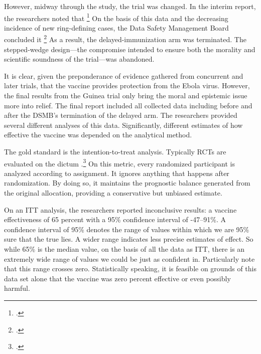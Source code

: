 \documentclass[letterpaper,notitlepage,12pt]{article}
\begin{document}
However, midway through the study, the trial was changed.
In the interim report, 
the researchers noted that \footcite[p. 857]{HR 2015}
On the basis of this data and the decreasing incidence of new ring-defining
cases, the Data Safety Management Board concluded it
\footcite{UF 2015} 
As a result, the delayed-immunization arm was terminated.
The stepped-wedge design---the compromise intended to ensure both the morality
and scientific soundness of the trial---was abandoned.

It is clear, given the preponderance of evidence gathered from
concurrent and later trials, that the vaccine provides protection
from the Ebola virus.
However, the final results from the Guinea trial only bring the moral and
epistemic issue more into relief.
The final report included all collected data including before and after the 
DSMB's termination of the delayed arm.
The researchers provided several different analyses of this data.
Significantly, different estimates of how effective the vaccine was depended on
the analytical method.

The gold standard is the intention-to-treat analysis.
Typically RCTs are evaluated on the dictum .\footcite{Heenekens et al 1987}
On this metric, every randomized participant is analyzed according to
assignment.
It ignores anything that happens after randomization.
By doing so, it maintains the prognostic balance generated from the original
allocation, providing a conservative but unbiased estimate.

On an ITT analysis, the researchers reported inconclusive results: a vaccine
effectiveness of 65 percent with a 95\% confidence interval of -47--91\%.
A confidence interval of 95\% denotes the range of values within which we are
95\% sure that the true lies.
A wider range indicates less precise estimates of effect.
So while 65\% is the median value, on the basis of all the data as ITT, there 
is an extremely wide range of values we could be just as confident in.
Particularly note that this range crosses zero.
Statistically speaking, it is feasible on grounds of this data set alone that
the vaccine was zero percent effective or even possibly harmful.
\end{document}
